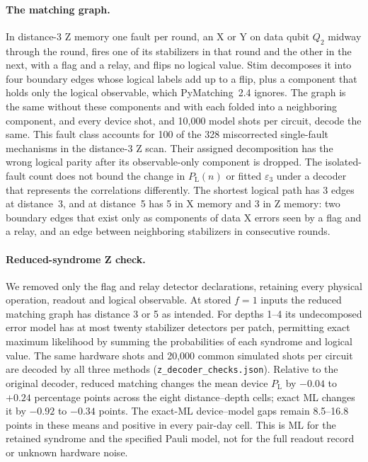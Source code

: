 \documentclass[aps,pra,reprint,nofootinbib,longbibliography,floatfix,showkeys]{revtex4-2}
\newcommand{\eps}{\varepsilon}
\newcommand{\PL}{P_{\mathrm{L}}}
\begin{document}
\paragraph*{The matching graph.}
In distance-3 Z memory one fault per round, an X or Y on data qubit $Q_2$ midway through the round, fires one of its stabilizers in that round and the other in the next, with a flag and a relay, and flips no logical value.
Stim decomposes it into four boundary edges whose logical labels add up to a flip, plus a component that holds only the logical observable, which PyMatching~2.4 ignores.
The graph is the same without these components and with each folded into a neighboring component, and every device shot, and 10,000 model shots per circuit, decode the same.
This fault class accounts for 100 of the 328 miscorrected single-fault mechanisms in the distance-3 Z scan.
Their assigned decomposition has the wrong logical parity after its observable-only component is dropped.
The isolated-fault count does not bound the change in $\PL(n)$ or fitted $\eps_3$ under a decoder that represents the correlations differently.
The shortest logical path has 3 edges at distance~3, and at distance~5 has 5 in X memory and 3 in Z memory: two boundary edges that exist only as components of data X errors seen by a flag and a relay, and an edge between neighboring stabilizers in consecutive rounds.

\paragraph*{Reduced-syndrome Z check.}
We removed only the flag and relay detector declarations, retaining every physical operation, readout and logical observable.
At stored $f=1$ inputs the reduced matching graph has distance 3 or 5 as intended.
For depths 1--4 its undecomposed error model has at most twenty stabilizer detectors per patch, permitting exact maximum likelihood by summing the probabilities of each syndrome and logical value.
The same hardware shots and 20,000 common simulated shots per circuit are decoded by all three methods (\texttt{z\_decoder\_checks.json}).
Relative to the original decoder, reduced matching changes the mean device $\PL$ by $-0.04$ to $+0.24$ percentage points across the eight distance--depth cells; exact ML changes it by $-0.92$ to $-0.34$ points.
The exact-ML device--model gaps remain 8.5--16.8 points in these means and positive in every pair-day cell.
This is ML for the retained syndrome and the specified Pauli model, not for the full readout record or unknown hardware noise.
\end{document}
